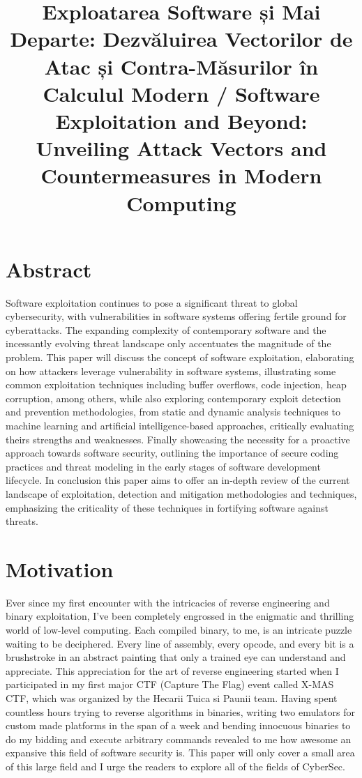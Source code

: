 \documentclass{article}
\begin{document}
\title{Exploatarea Software și Mai Departe: Dezvăluirea Vectorilor de Atac și Contra-Măsurilor în Calculul Modern / Software Exploitation and Beyond: Unveiling Attack Vectors and Countermeasures in Modern Computing}
\maketitle
\section{Abstract}%

Software exploitation continues to pose a significant threat to global
cybersecurity, with vulnerabilities in software systems offering fertile ground
for cyberattacks. The expanding complexity of contemporary software and the
incessantly evolving threat landscape only accentuates the magnitude of the
problem. This paper will discuss the concept of software exploitation,
elaborating on how attackers leverage vulnerability in software systems,
illustrating some common exploitation techniques including buffer overflows,
code injection, heap corruption, among others, while also exploring contemporary
exploit detection and prevention methodologies, from static and dynamic analysis
techniques to machine learning and artificial intelligence-based approaches,
critically evaluating theirs strengths and weaknesses. Finally showcasing the
necessity for a proactive approach towards software security, outlining the
importance of secure coding practices and threat modeling in the early stages of
software development lifecycle. In conclusion this paper aims to offer an
in-depth review of the current landscape of exploitation, detection and
mitigation methodologies and techniques, emphasizing the criticality of these
techniques in fortifying software against threats.

\section{Motivation}%

Ever since my first encounter with the intricacies of reverse engineering and
binary exploitation, I've been completely engrossed in the enigmatic and
thrilling world of low-level computing. Each compiled binary, to me, is an
intricate puzzle waiting to be deciphered. Every line of assembly, every opcode,
and every bit is a brushstroke in an abstract painting that only a trained eye
can understand and appreciate. This appreciation for the art of reverse
engineering started when I participated in my first major CTF (Capture The Flag)
event called X-MAS CTF, which was organized by the Hecarii Tuica si Paunii team.
Having spent countless hours trying to reverse algorithms in binaries, writing
two emulators for custom made platforms in the span of a week and bending
innocuous binaries to do my bidding and execute arbitrary commands revealed to
me how awesome an expansive this field of software security is. This paper will
only cover a small area of this large field and I urge the readers to explore
all of the fields of CyberSec.
\end{document}
